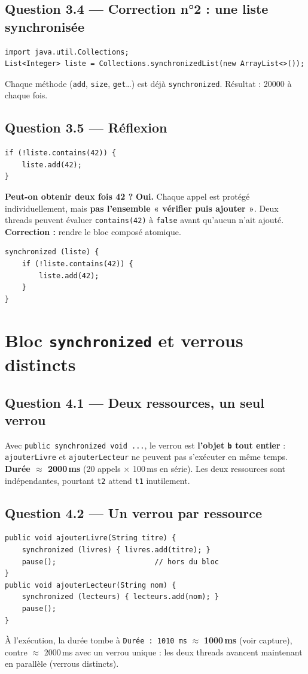 \documentclass[11pt,a4paper]{article}
\begin{document}
\subsection{Question 3.4 — Correction n°2 : une liste synchronisée}
\begin{lstlisting}
import java.util.Collections;
List<Integer> liste = Collections.synchronizedList(new ArrayList<>());
\end{lstlisting}
Chaque méthode (\texttt{add}, \texttt{size}, \texttt{get}…) est déjà
\texttt{synchronized}. Résultat : 20000 à chaque fois.

\subsection{Question 3.5 — Réflexion}
\begin{lstlisting}
if (!liste.contains(42)) {
    liste.add(42);
}
\end{lstlisting}
\textbf{Peut-on obtenir deux fois 42 ?} \textbf{Oui.} Chaque appel est protégé
individuellement, mais \textbf{pas l'ensemble « vérifier puis ajouter »}. Deux threads
peuvent évaluer \texttt{contains(42)} à \texttt{false} avant qu'aucun n'ait ajouté.
\textbf{Correction :} rendre le bloc composé atomique.
\begin{lstlisting}
synchronized (liste) {
    if (!liste.contains(42)) {
        liste.add(42);
    }
}
\end{lstlisting}

\section{Bloc \texttt{synchronized} et verrous distincts}

\subsection{Question 4.1 — Deux ressources, un seul verrou}
Avec \texttt{public synchronized void ...}, le verrou est \textbf{l'objet \texttt{b}
tout entier} : \texttt{ajouterLivre} et \texttt{ajouterLecteur} ne peuvent pas
s'exécuter en même temps. \textbf{Durée $\approx$ 2000\,ms} (20 appels × 100\,ms en
série). Les deux ressources sont indépendantes, pourtant \texttt{t2} attend
\texttt{t1} inutilement.

\subsection{Question 4.2 — Un verrou par ressource}
\begin{lstlisting}
public void ajouterLivre(String titre) {
    synchronized (livres) { livres.add(titre); }
    pause();                       // hors du bloc
}
public void ajouterLecteur(String nom) {
    synchronized (lecteurs) { lecteurs.add(nom); }
    pause();
}
\end{lstlisting}
À l'exécution, la durée tombe à \texttt{Durée : 1010 ms} $\approx$ \textbf{1000\,ms}
(voir capture), contre $\approx$ 2000\,ms avec un verrou unique : les deux threads
avancent maintenant en parallèle (verrous distincts).
\end{document}
